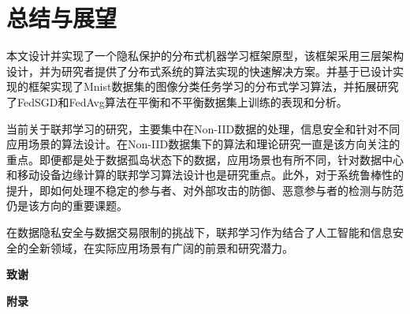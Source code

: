 \documentclass[zihao = -4,cn]{oucart}
\begin{document}
\section{总结与展望}
本文设计并实现了一个隐私保护的分布式机器学习框架原型，该框架采用三层架构设计，并为研究者提供了分布式系统的算法实现的快速解决方案。并基于已设计实现的框架实现了Mnist数据集的图像分类任务学习的分布式学习算法，并拓展研究了FedSGD和FedAvg算法在平衡和不平衡数据集上训练的表现和分析。\par
当前关于联邦学习的研究，主要集中在Non-IID数据的处理，信息安全和针对不同应用场景的算法设计。在Non-IID数据集下的算法和理论研究一直是该方向关注的重点。即便都是处于数据孤岛状态下的数据，应用场景也有所不同，针对数据中心和移动设备边缘计算的联邦学习算法设计也是研究重点。此外，对于系统鲁棒性的提升，即如何处理不稳定的参与者、对外部攻击的防御、恶意参与者的检测与防范仍是该方向的重要课题。\par
在数据隐私安全与数据交易限制的挑战下，联邦学习作为结合了人工智能和信息安全的全新领域，在实际应用场景有广阔的前景和研究潜力。


\newpage
%


\newpage
\begin{center}
 \textbf{致谢} \\
\end{center}

\newpage
\begin{center}
 \textbf{附录} \\
\end{center}
\end{document}
